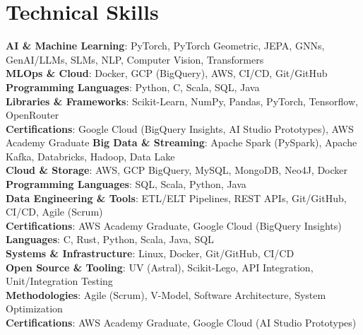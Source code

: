 \section{Technical Skills}
 \begin{itemize}[leftmargin=0in, label={}]
    \small{\item{
    \ifisML
     \textbf{AI \& Machine Learning}{: PyTorch, PyTorch Geometric, JEPA, GNNs, GenAI/LLMs, SLMs, NLP, Computer Vision, Transformers} \\
     \textbf{MLOps \& Cloud}{: Docker, GCP (BigQuery), AWS, CI/CD, Git/GitHub} \\
     \textbf{Programming Languages}{: Python, C, Scala, SQL, Java} \\
     \textbf{Libraries \& Frameworks}{: Scikit-Learn, NumPy, Pandas, PyTorch, Tensorflow, OpenRouter} \\
     \textbf{Certifications}{: Google Cloud (BigQuery Insights, AI Studio Prototypes), AWS Academy Graduate}
    \fi
    \ifisDE
     \textbf{Big Data \& Streaming}{: Apache Spark (PySpark), Apache Kafka, Databricks, Hadoop, Data Lake} \\
     \textbf{Cloud \& Storage}{: AWS, GCP BigQuery, MySQL, MongoDB, Neo4J, Docker} \\
     \textbf{Programming Languages}{: SQL, Scala, Python, Java} \\
     \textbf{Data Engineering \& Tools}{: ETL/ELT Pipelines, REST APIs, Git/GitHub, CI/CD, Agile (Scrum)} \\
     \textbf{Certifications}{: AWS Academy Graduate, Google Cloud (BigQuery Insights)}
    \fi
    \ifisSWE
     \textbf{Languages}{: C, Rust, Python, Scala, Java, SQL} \\
     \textbf{Systems \& Infrastructure}{: Linux, Docker, Git/GitHub, CI/CD} \\
     \textbf{Open Source \& Tooling}{: UV (Astral), Scikit-Lego, API Integration, Unit/Integration Testing} \\
     \textbf{Methodologies}{: Agile (Scrum), V-Model, Software Architecture, System Optimization} \\
     \textbf{Certifications}{: AWS Academy Graduate, Google Cloud (AI Studio Prototypes)}
    \fi
    }}
 \end{itemize}
